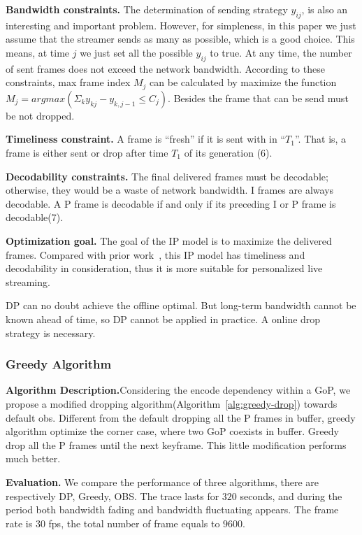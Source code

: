 \textbf{Bandwidth constraints.}
The determination of sending strategy $y_{ij}$, is also an interesting and important problem. However, for simpleness, in this paper we just assume that the streamer sends as many as possible, which is a good choice. This means, at time $j$ we just set all the possible $y_{ij}$ to true. At any time, the number of sent frames does not exceed the network bandwidth. According to these constraints, max frame index $M_{j}$ can be calculated by maximize the function $M_j = argmax(\Sigma_k y_{kj}-y_{k,j-1} \leq C_{j})$. Besides the frame that can be send must be not dropped.

\textbf{Timeliness constraint.}
A frame is ``fresh'' if it is sent with in ``$T_1$''. That is, a frame is either sent or drop after time $T_1$ of its generation (6).

\textbf{Decodability constraints.} The final delivered frames must be decodable; otherwise, they would be a waste of network bandwidth. I frames are always decodable. A P frame is decodable if and only if its preceding I or P frame is decodable(7).

\textbf{Optimization goal.} The goal of the IP model is to maximize the delivered frames.
Compared with prior work~\cite{singh2004dynamic}, this IP model has timeliness and decodability in consideration, thus it is more suitable for personalized live streaming.

 DP can no doubt achieve the offline optimal. But long-term bandwidth cannot be known ahead of time, so DP cannot be applied in practice. A online drop strategy is necessary.

\subsubsection{Greedy Algorithm}

\textbf{Algorithm Description.}Considering the encode dependency within a GoP, we propose a modified dropping algorithm(Algorithm~\ref{alg:greedy-drop}) towards default obs. Different from the
default dropping all the P frames in buffer, greedy algorithm optimize the corner case, where two GoP coexists in buffer. Greedy drop all the P frames until the next keyframe. This little modification performs much better.

\textbf{Evaluation.} We compare the performance of three algorithms, there are respectively DP, Greedy, OBS. The trace lasts for $320$ seconds, and during the period both bandwidth fading and bandwidth fluctuating appears. The frame rate is $30$ fps, the total number of frame equals to $9600$.


